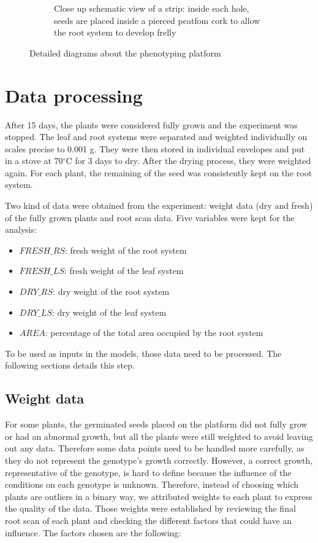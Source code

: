 \begin{figure}[!htb]
\begin{subfigure}[b]{0.475\textwidth}
            \caption{Close up schematic view of a strip: inside each hole, seeds are placed inside a pierced peatfom cork to allow the root system to develop frelly}    
            \label{fig:seed_platform_close_up}
        \end{subfigure}
        \caption{Detailed diagrams about the phenotyping platform}
    \end{figure}


\section{Data processing}
After 15 days, the plants were considered fully grown and the experiment was stopped. The leaf and root systems were separated and weighted individually on scales precise to 0.001 g. They were then stored in individual envelopes and put in a stove at 70$^{\circ}$C for 3 days to dry. After the drying process, they were weighted again. For each plant, the remaining of the seed was consistently kept on the root system.

Two kind of data were obtained from the experiment: weight data (dry and fresh) of the fully grown plants and root scan data. Five variables were kept for the analysis:

\begin{itemize}
\item $FRESH\_RS$: fresh weight of the root system
\item $FRESH\_LS$: fresh weight of the leaf system
\item $DRY\_RS$: dry weight of the root system
\item $DRY\_LS$: dry weight of the leaf system
\item $AREA$: percentage of the total area occupied by the root system
\end{itemize} 

To be used as inputs in the models, those data need to be processed. The following sections details this step.

\subsection{Weight data}
For some plants, the germinated seeds placed on the platform did not fully grow or had an abnormal growth, but all the plants were still weighted to avoid leaving out any data. Therefore some data points need to be handled more carefully, as they do not represent the genotype's growth correctly. However, a correct growth, representative of the genotype, is hard to define because the influence of the conditions on each genotype is unknown. Therefore, instead of choosing which plants are outliers in a binary way, we attributed weights to each plant to express the quality of the data. Those weights were established by reviewing the final root scan of each plant and checking the different factors that could have an influence. The factors chosen are the following:

